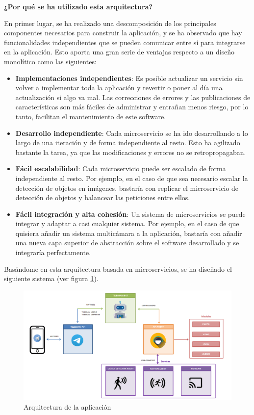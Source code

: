 \newpage

\textbf{¿Por qué se ha utilizado esta arquitectura?}

En primer lugar, se ha realizado una descomposición de los principales componentes necesarios para construir la aplicación, y se ha observado que hay funcionalidades independientes que se pueden comunicar entre sí para integrarse en la aplicación. Esto aporta una gran serie de ventajas respecto a un diseño monolítico \cite{ref26} como las siguientes:

\begin{itemize}
\item \textbf{Implementaciones independientes}: Es posible actualizar un servicio sin volver a implementar toda la aplicación y revertir o poner al día una actualización si algo va mal. Las correcciones de errores y las publicaciones de características son más fáciles de administrar y entrañan menos riesgo, por lo tanto, facilitan el mantenimiento de este software.

\item \textbf{Desarrollo independiente}: Cada microservicio se ha ido desarrollando a lo largo de una iteración y de forma independiente al resto. Esto ha agilizado bastante la tarea, ya que las modificaciones y errores no se retropropagaban.

\item \textbf{Fácil escalabilidad}: Cada microservicio puede ser escalado de forma independiente al resto. Por ejemplo, en el caso de que sea necesario escalar la detección de objetos en imágenes, bastaría con replicar el microservicio de detección de objetos y balancear las peticiones entre ellos.

\item \textbf{Fácil integración y alta cohesión}: Un sistema de microservicios se puede integrar y adaptar a casi cualquier sistema. Por ejemplo, en el caso de que quisiera añadir un sistema multicámara a la aplicación, bastaría con añadir una nueva capa superior de abstracción sobre el software desarrollado y se integraría perfectamente.
\end{itemize}

Basándome en esta arquitectura basada en microservicios, se ha diseñado el siguiente sistema (ver figura \ref{img:arquitectura}).

\newpage

\begin{figure}[h]
	\centering
	\includegraphics[scale=0.4]{images/23}
	\caption{Arquitectura de la aplicación}
	\label{img:arquitectura}
\end{figure}


